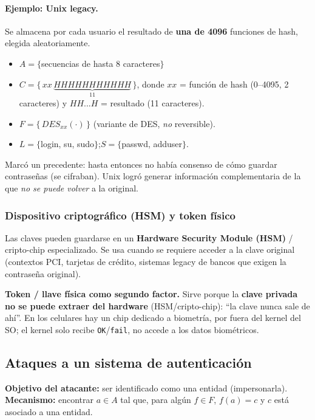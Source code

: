 \documentclass[../main.tex]{subfiles}
\begin{document}
\paragraph{Ejemplo: Unix legacy.} Se almacena por cada usuario el resultado de \textbf{una de 4096} funciones de hash, elegida aleatoriamente.
\begin{itemize}[itemsep=1pt]
  \item $A=\{$secuencias de hasta 8 caracteres$\}$
  \item $C=\{\,xx\,\underbrace{HHHHHHHHHHH}_{11}\,\}$, donde $xx$ = función de hash (0--4095, 2 caracteres) y $HH...H$ = resultado (11 caracteres).
  \item $F=\{\,DES_{xx}(\cdot)\,\}$ (variante de DES, \emph{no} reversible).
  \item $L=\{$login, su, sudo$\}$;\quad $S=\{$passwd, adduser$\}$.
\end{itemize}
Marcó un precedente: hasta entonces no había consenso de cómo guardar contraseñas (se cifraban). Unix logró generar información complementaria de la que \emph{no se puede volver} a la original.

\subsubsection{Dispositivo criptográfico (HSM) y token físico}

Las claves pueden guardarse en un \textbf{Hardware Security Module (HSM)} / cripto-chip especializado. Se usa cuando se requiere acceder a la clave original (contextos PCI, tarjetas de crédito, sistemas legacy de bancos que exigen la contraseña original).

\begin{examen}
\textbf{Token / llave física como segundo factor.} Sirve porque la \textbf{clave privada no se puede extraer del hardware} (HSM/cripto-chip): ``la clave nunca sale de ahí''. En los celulares hay un chip dedicado a biometría, por fuera del kernel del SO; el kernel solo recibe \texttt{OK}/\texttt{fail}, no accede a los datos biométricos.
\end{examen}

\subsection{Ataques a un sistema de autenticación}

\textbf{Objetivo del atacante:} ser identificado como una entidad (impersonarla). \textbf{Mecanismo:} encontrar $a\in A$ tal que, para algún $f\in F$, $f(a)=c$ y $c$ está asociado a una entidad.
\end{document}
